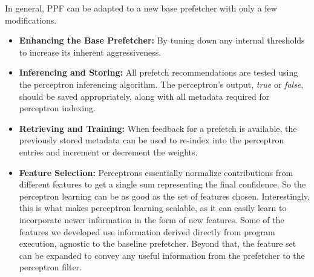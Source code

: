 In general, PPF can be adapted to a new base prefetcher with only a
few modifications.
\begin{itemize}

\item \textbf{Enhancing the Base Prefetcher:} By tuning down any
  internal thresholds to increase its inherent aggressiveness.

\item \textbf{Inferencing and Storing:} All prefetch recommendations
  are tested using the perceptron inferencing algorithm. The
  perceptron's output, \textit{true} or \textit{false}, should be
  saved appropriately, along with all metadata required for perceptron
  indexing.

\item \textbf{Retrieving and Training:} When feedback for a prefetch
  is available, the previously stored metadata can be used to re-index
  into the perceptron entries and increment or decrement the weights.

\item \textbf{Feature Selection:}  Perceptrons essentially normalize
  contributions from different features to get a single sum representing the
  final confidence. So the perceptron learning can be as good as the set of 
  features chosen. Interestingly, this is what makes perceptron learning 
  scalable, as it can easily learn to incorporate newer information in 
  the form of new features. Some of the features we developed use information 
  derived directly from program execution, agnostic to the baseline 
  prefetcher. Beyond that, the feature set can be expanded to convey 
  any useful information from the prefetcher to the perceptron filter. 
  


\end{itemize}
